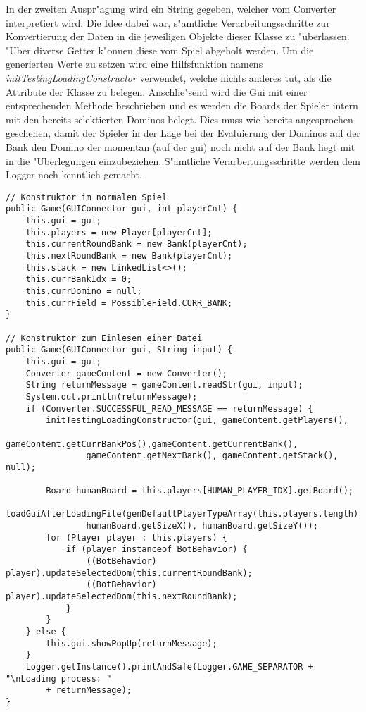 In der zweiten Auspr"agung wird ein String gegeben, welcher vom Converter interpretiert wird. Die Idee dabei war, s"amtliche Verarbeitungsschritte zur Konvertierung der Daten in die jeweiligen Objekte dieser Klasse zu "uberlassen. "Uber diverse Getter k"onnen diese vom Spiel \grqq abgeholt\glqq {} werden. Um die generierten Werte zu setzen wird eine Hilfsfunktion namens \emph{initTestingLoadingConstructor} verwendet, welche nichts anderes tut, als die Attribute der Klasse zu belegen. Anschlie"send wird die Gui mit einer entsprechenden Methode beschrieben und es werden die Boards der Spieler intern mit den bereits selektierten Dominos belegt. Dies muss wie bereits angesprochen geschehen, damit der Spieler in der Lage bei der Evaluierung der Dominos auf der Bank den Domino der momentan (auf der gui) noch nicht auf der Bank liegt mit in die "Uberlegungen einzubeziehen. 
S"amtliche Verarbeitungsschritte werden dem Logger noch kenntlich gemacht. 
\begin{lstlisting}[float,style=CodeHighlighting,caption=Game - Konstruktoren,label=lst:game_konstruktor]
// Konstruktor im normalen Spiel
public Game(GUIConnector gui, int playerCnt) {
    this.gui = gui;
    this.players = new Player[playerCnt];
    this.currentRoundBank = new Bank(playerCnt);
    this.nextRoundBank = new Bank(playerCnt);
    this.stack = new LinkedList<>();
    this.currBankIdx = 0;
    this.currDomino = null;
    this.currField = PossibleField.CURR_BANK;
}

// Konstruktor zum Einlesen einer Datei
public Game(GUIConnector gui, String input) {
    this.gui = gui;
    Converter gameContent = new Converter();
    String returnMessage = gameContent.readStr(gui, input);
    System.out.println(returnMessage);
    if (Converter.SUCCESSFUL_READ_MESSAGE == returnMessage) {
        initTestingLoadingConstructor(gui, gameContent.getPlayers(),
        		gameContent.getCurrBankPos(),gameContent.getCurrentBank(),
                gameContent.getNextBank(), gameContent.getStack(), null);

        Board humanBoard = this.players[HUMAN_PLAYER_IDX].getBoard();
        loadGuiAfterLoadingFile(genDefaultPlayerTypeArray(this.players.length),
        		humanBoard.getSizeX(), humanBoard.getSizeY());
        for (Player player : this.players) {
            if (player instanceof BotBehavior) {
                ((BotBehavior) player).updateSelectedDom(this.currentRoundBank);
                ((BotBehavior) player).updateSelectedDom(this.nextRoundBank);
            }
        }
    } else {
        this.gui.showPopUp(returnMessage);
    }
    Logger.getInstance().printAndSafe(Logger.GAME_SEPARATOR + "\nLoading process: " 
    	+ returnMessage);
}
\end{lstlisting}

